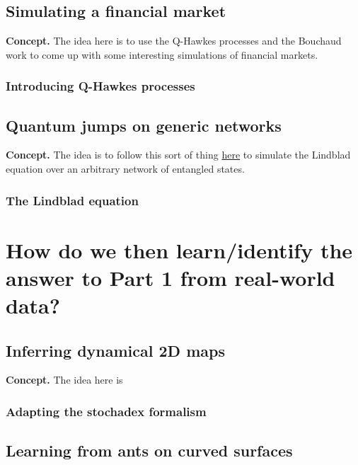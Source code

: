 \documentclass{book}
\begin{document}
\chapter{\sffamily Simulating a financial market}

{\bfseries\sffamily Concept.} The idea here is to use the Q-Hawkes processes and the Bouchaud work to come up with some interesting simulations of financial markets. 

\section{\sffamily Introducing Q-Hawkes processes}


\chapter{\sffamily Quantum jumps on generic networks}

{\bfseries\sffamily Concept.} The idea is to follow this sort of thing \href{https://en.wikipedia.org/wiki/Quantum_jump_method}{here} to simulate the Lindblad equation over an arbitrary network of entangled states.

\section{\sffamily The Lindblad equation}


\part*{{ How do we then learn/identify the answer to Part 1 from real-world data?}}


\chapter{\sffamily Inferring dynamical 2D maps}

{\bfseries\sffamily Concept.} The idea here is 


\section{\sffamily Adapting the stochadex formalism}

\chapter{\sffamily Learning from ants on curved surfaces}
\end{document}
